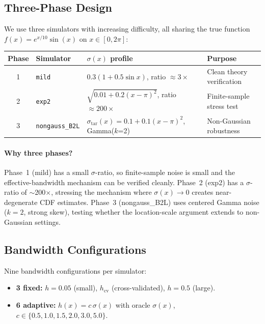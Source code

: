 \documentclass[11pt]{article}
\theoremstyle{remark}
\begin{document}
\subsection{Three-Phase Design}

We use three simulators with increasing difficulty, all sharing the
true function $f(x) = e^{x/10}\sin(x)$ on $x \in [0, 2\pi]$:

\begin{center}
\begin{tabular}{@{}clll@{}}
\toprule
\textbf{Phase} & \textbf{Simulator} & \textbf{$\sigma(x)$ profile} &
  \textbf{Purpose} \\
\midrule
1 & \texttt{mild} &
  $0.3(1 + 0.5\sin x)$, ratio $\approx 3\times$ &
  Clean theory verification \\
2 & \texttt{exp2} &
  $\sqrt{0.01 + 0.2(x-\pi)^2}$, ratio $\approx 200\times$ &
  Finite-sample stress test \\
3 & \texttt{nongauss\_B2L} &
  $\sigma_{\mathrm{tar}}(x) = 0.1 + 0.1(x-\pi)^2$, Gamma($k$=2) &
  Non-Gaussian robustness \\
\bottomrule
\end{tabular}
\end{center}

\paragraph{Why three phases?}
Phase~1 (mild) has a small $\sigma$-ratio, so finite-sample noise is
small and the effective-bandwidth mechanism can be verified cleanly.
Phase~2 (exp2) has a $\sigma$-ratio of $\sim$200$\times$, stressing the
mechanism where $\sigma(x) \to 0$ creates near-degenerate CDF
estimates. Phase~3 (nongauss\_B2L) uses centered Gamma noise ($k=2$,
strong skew), testing whether the location-scale argument extends to
non-Gaussian settings.

\subsection{Bandwidth Configurations}

Nine bandwidth configurations per simulator:
\begin{itemize}
  \item \textbf{3 fixed:} $h = 0.05$ (small), $h_{\mathrm{cv}}$
    (cross-validated), $h = 0.5$ (large).
  \item \textbf{6 adaptive:} $h(x) = c\,\sigma(x)$ with oracle
    $\sigma(x)$, $c \in \{0.5, 1.0, 1.5, 2.0, 3.0, 5.0\}$.
\end{itemize}
\end{document}
